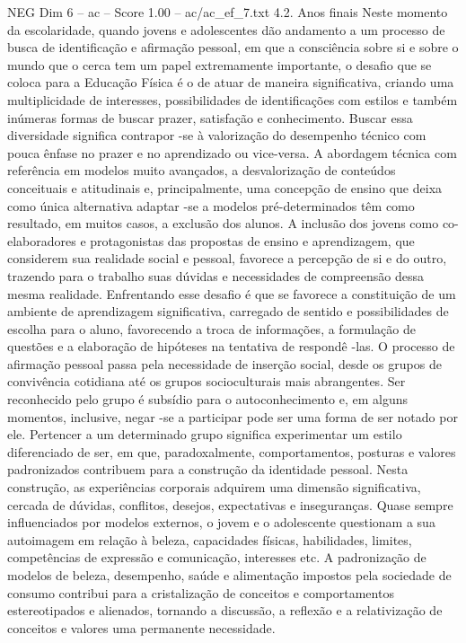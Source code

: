\begin{textsample}{NEG Dim 6 – ac – Score 1.00 – ac/ac\_ef\_7.txt}  \label{ex:f6_neg_133}
4.2.
Anos finais Neste momento da escolaridade, quando jovens e adolescentes dão andamento a um processo de busca de identificação e afirmação pessoal, em que a consciência sobre si e sobre o mundo que o cerca tem um papel extremamente importante, o desafio que se coloca para a Educação Física é o de atuar de maneira significativa, criando uma multiplicidade de interesses, possibilidades de identificações com estilos e também inúmeras formas de buscar prazer, satisfação e conhecimento.
Buscar essa diversidade significa contrapor -se à valorização do desempenho técnico com pouca ênfase no prazer e no aprendizado ou vice-versa.
A abordagem técnica com referência em modelos muito avançados, a desvalorização de conteúdos conceituais e atitudinais e, principalmente, uma concepção de ensino que deixa como única alternativa adaptar -se a modelos pré-determinados têm como resultado, em muitos casos, a exclusão dos alunos.
A inclusão dos jovens como co-elaboradores e protagonistas das propostas de ensino e aprendizagem, que considerem sua realidade social e pessoal, favorece a percepção de si e do outro, trazendo para o trabalho suas dúvidas e necessidades de compreensão dessa mesma realidade.
Enfrentando esse desafio é que se favorece a constituição de um ambiente de aprendizagem significativa, carregado de sentido e possibilidades de escolha para o aluno, favorecendo a troca de informações, a formulação de questões e a elaboração de hipóteses na tentativa de respondê -las.
O processo de afirmação pessoal passa pela necessidade de inserção social, desde os grupos de convivência cotidiana até os grupos socioculturais mais abrangentes.
Ser reconhecido pelo grupo é subsídio para o autoconhecimento e, em alguns momentos, inclusive, negar -se a participar pode ser uma forma de ser notado por ele.
Pertencer a um determinado grupo significa experimentar um estilo diferenciado de ser, em que, paradoxalmente, comportamentos, posturas e valores padronizados contribuem para a construção da identidade pessoal.
Nesta construção, as experiências corporais adquirem uma dimensão significativa, cercada de dúvidas, conflitos, desejos, expectativas e inseguranças.
Quase sempre influenciados por modelos externos, o jovem e o adolescente questionam a sua autoimagem em relação à beleza, capacidades físicas, habilidades, limites, competências de expressão e comunicação, interesses etc.
A padronização de modelos de beleza, desempenho, saúde e alimentação impostos pela sociedade de consumo contribui para a cristalização de conceitos e comportamentos estereotipados e alienados, tornando a discussão, a reflexão e a relativização de conceitos e valores uma permanente necessidade.

\end{textsample}
